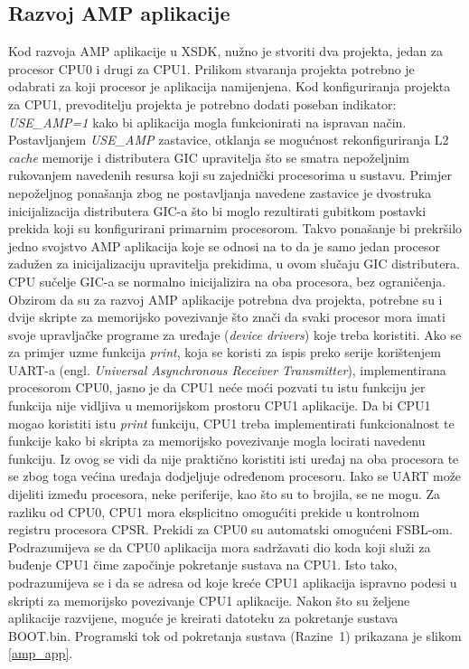 \documentclass[times, utf8, diplomski, numeric]{fer}
\begin{document}
\subsection{Razvoj AMP aplikacije}
Kod razvoja AMP aplikacije u XSDK, nužno je stvoriti dva projekta, jedan za procesor CPU0 i drugi za CPU1.
Prilikom stvaranja projekta potrebno je odabrati za koji procesor je aplikacija namijenjena. Kod konfiguriranja
projekta za CPU1, prevoditelju projekta je potrebno dodati poseban indikator: \textit{USE\_AMP=1} kako bi aplikacija mogla
funkcionirati na ispravan način. Postavljanjem \textit{USE\_AMP} zastavice, otklanja se mogućnost rekonfiguriranja L2 \textit{cache}
memorije i distributera GIC upravitelja što se smatra nepoželjnim rukovanjem navedenih resursa koji su zajednički procesorima
u sustavu. Primjer nepoželjnog ponašanja zbog ne postavljanja navedene zastavice je dvostruka inicijalizacija distributera
GIC-a što bi moglo rezultirati gubitkom postavki prekida koji su konfigurirani primarnim procesorom. Takvo ponašanje bi
prekršilo jedno svojstvo AMP aplikacija koje se odnosi na to da je samo jedan procesor zadužen za inicijalizaciju upravitelja
prekidima, u ovom slučaju GIC distributera. CPU sučelje GIC-a se normalno inicijalizira na oba procesora, bez ograničenja.
Obzirom da su za razvoj AMP aplikacije potrebna dva projekta, potrebne su i dvije skripte za memorijsko povezivanje što
znači da svaki procesor mora imati svoje upravljačke programe za uređaje (\textit{device drivers}) koje treba koristiti.
Ako se za primjer uzme funkcija \textit{print}, koja se koristi za ispis preko serije korištenjem UART-a (engl. \textit{Universal
Asynchronous Receiver Transmitter}), implementirana procesorom CPU0, jasno je da CPU1 neće moći pozvati tu istu funkciju
jer funkcija nije vidljiva u memorijskom prostoru CPU1 aplikacije. Da bi CPU1 mogao koristiti istu \textit{print} funkciju,
CPU1 treba implementirati funkcionalnost te funkcije kako bi skripta za memorijsko povezivanje mogla locirati navedenu
funkciju. Iz ovog se vidi da nije praktično koristiti isti uređaj na oba procesora te se zbog toga većina uređaja dodjeljuje
određenom procesoru. Iako se UART može dijeliti između procesora, neke periferije, kao što su to brojila, se ne mogu.
Za razliku od CPU0, CPU1 mora eksplicitno omogućiti prekide u kontrolnom registru procesora CPSR. Prekidi za CPU0 su
automatski omogućeni FSBL-om. Podrazumijeva se da CPU0 aplikacija mora sadržavati dio koda koji služi za buđenje CPU1
čime započinje pokretanje sustava na CPU1. Isto tako, podrazumijeva se i da se adresa od koje kreće CPU1 aplikacija
ispravno podesi u skripti za memorijsko povezivanje CPU1 aplikacije. Nakon što su željene aplikacije razvijene, moguće
je kreirati datoteku za pokretanje sustava BOOT.bin. Programski tok od pokretanja sustava (Razine~1) prikazana je slikom
\ref{amp_app}.
\end{document}
